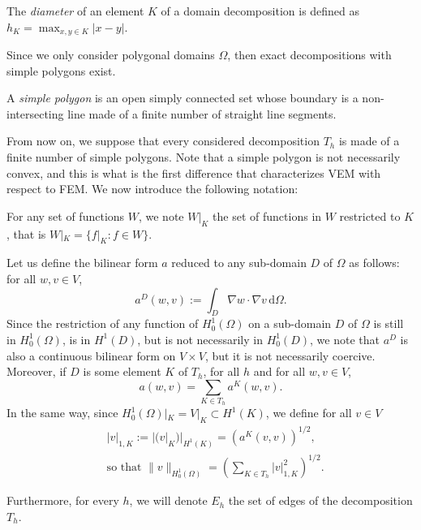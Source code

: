 \begin{definition}[Diameter]
The \textit{diameter} of an element $K$ of a domain decomposition is defined as $h_K = \max_{x,y\in K}|x-y|$. 
\end{definition}

\noindent Since we only consider polygonal domains $\Omega$, then exact decompositions with simple polygons exist. 

\begin{definition}
A \textit{simple polygon} is an open simply connected set whose boundary is a non-intersecting line made of a finite number of straight line segments. 
\end{definition}

\noindent From now on, we suppose that every considered decomposition $T_h$ is made of a finite number of simple polygons. Note that a simple polygon is not necessarily convex, and this is what is the first difference that characterizes VEM with respect to FEM. We now introduce the following notation: 
\begin{notation}
For any set of functions $W$, we note $W|_K$ the set of functions in $W$ restricted to $K$, that is $W|_K = \{f|_K : f\in W\}$. 
\end{notation}

\noindent Let us define the bilinear form $a$ reduced to any sub-domain $D$ of $\Omega$ as follows: for all $w,v\in V$,
$$ a^D(w,v) := \int_D \nabla w \cdot \nabla v \, \mathrm{d}\Omega. $$
Since the restriction of any function of $H_0^1(\Omega)$ on a sub-domain $D$ of $\Omega$ is still in $H_0^1(\Omega)$, is in $H^1(D)$, but is not necessarily in $H_0^1(D)$, we note that $a^D$ is also a continuous bilinear form on $V\times V$, but it is not necessarily coercive. Moreover, if $D$ is some element $K$ of $T_h$, for all $h$ and for all $w,v\in V$, \begin{equation}\label{aKvsa}
a(w,v) = \sum_{K\in T_h} a^K(w,v).
\end{equation}
In the same way, since $H_0^1(\Omega)|_K = V|_K \subset H^1(K)$, we define for all $v\in V$
\begin{align}
&|v|_{1, K} := |(v|_K)|_{H^1(K)} = \left( a^K\left( v,v \right)\right)^{1/2}, \label{def1Knorm}\\
&\text{so that } \|v\|_{H_0^1(\Omega)} = \left(\sum_{K\in T_h} |v|_{1,K}^2\right)^{1/2}.\label{H01normsplit}
\end{align} 

\noindent Furthermore, for every $h$, we will denote $E_h$ the set of edges of the decomposition $T_h$. 

